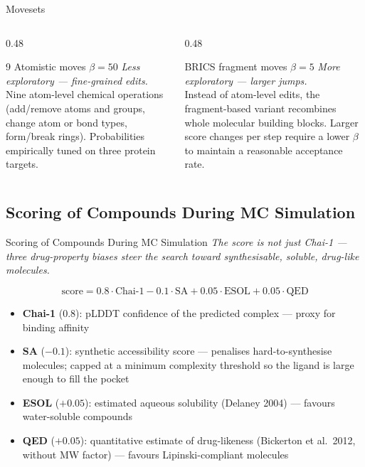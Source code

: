 \documentclass{beamer}
\begin{document}
\begin{frame}{Movesets}
  \begin{columns}[T]
    \begin{column}{0.48\textwidth}
      \begin{block}{9 Atomistic moves \quad $\beta = 50$}
        \textit{Less exploratory --- fine-grained edits.}\\[0.4em]
        Nine atom-level chemical operations (add/remove atoms and groups, change atom or bond types, form/break rings). Probabilities empirically tuned on three protein targets.
      \end{block}
    \end{column}
    \begin{column}{0.48\textwidth}
      \begin{block}{BRICS fragment moves \quad $\beta = 5$}
        \textit{More exploratory --- larger jumps.}\\[0.4em]
        Instead of atom-level edits, the fragment-based variant recombines whole molecular building blocks. Larger score changes per step require a lower $\beta$ to maintain a reasonable acceptance rate.
      \end{block}
    \end{column}
  \end{columns}
\end{frame}

\subsection{Scoring of Compounds During MC Simulation}

\begin{frame}{Scoring of Compounds During MC Simulation}
  \textit{The score is not just Chai-1 --- three drug-property biases steer the search toward synthesisable, soluble, drug-like molecules.}

  \[
    \text{score} = 0.8 \cdot \text{Chai-1} - 0.1 \cdot \text{SA} + 0.05 \cdot \text{ESOL} + 0.05 \cdot \text{QED}
  \]

  \begin{itemize}
    \item \textbf{Chai-1} (0.8): pLDDT confidence of the predicted complex --- proxy for binding affinity
    \item \textbf{SA} ($-0.1$): synthetic accessibility score --- penalises hard-to-synthesise molecules; capped at a minimum complexity threshold so the ligand is large enough to fill the pocket
    \item \textbf{ESOL} ($+0.05$): estimated aqueous solubility (Delaney 2004) --- favours water-soluble compounds
    \item \textbf{QED} ($+0.05$): quantitative estimate of drug-likeness (Bickerton et al.\ 2012, without MW factor) --- favours Lipinski-compliant molecules
  \end{itemize}
\end{frame}
\end{document}

